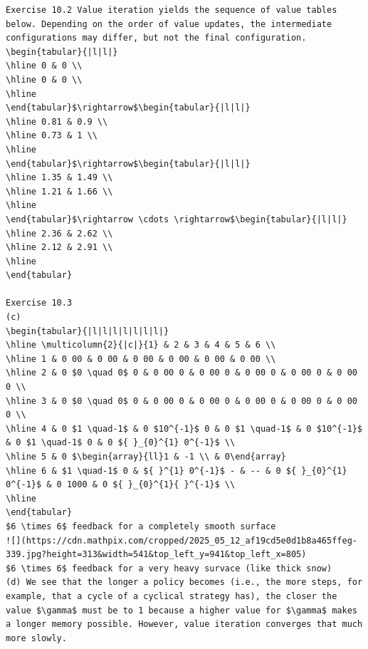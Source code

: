 \documentclass[10pt]{book}
\begin{document}
\begin{verbatim}
Exercise 10.2 Value iteration yields the sequence of value tables below. Depending on the order of value updates, the intermediate configurations may differ, but not the final configuration.
\begin{tabular}{|l|l|}
\hline 0 & 0 \\
\hline 0 & 0 \\
\hline
\end{tabular}$\rightarrow$\begin{tabular}{|l|l|}
\hline 0.81 & 0.9 \\
\hline 0.73 & 1 \\
\hline
\end{tabular}$\rightarrow$\begin{tabular}{|l|l|}
\hline 1.35 & 1.49 \\
\hline 1.21 & 1.66 \\
\hline
\end{tabular}$\rightarrow \cdots \rightarrow$\begin{tabular}{|l|l|}
\hline 2.36 & 2.62 \\
\hline 2.12 & 2.91 \\
\hline
\end{tabular}

Exercise 10.3
(c)
\begin{tabular}{|l|l|l|l|l|l|l|}
\hline \multicolumn{2}{|c|}{1} & 2 & 3 & 4 & 5 & 6 \\
\hline 1 & 0 00 & 0 00 & 0 00 & 0 00 & 0 00 & 0 00 \\
\hline 2 & 0 $0 \quad 0$ 0 & 0 00 0 & 0 00 0 & 0 00 0 & 0 00 0 & 0 00 0 \\
\hline 3 & 0 $0 \quad 0$ 0 & 0 00 0 & 0 00 0 & 0 00 0 & 0 00 0 & 0 00 0 \\
\hline 4 & 0 $1 \quad-1$ & 0 $10^{-1}$ 0 & 0 $1 \quad-1$ & 0 $10^{-1}$ & 0 $1 \quad-1$ 0 & 0 ${ }_{0}^{1} 0^{-1}$ \\
\hline 5 & 0 $\begin{array}{ll}1 & -1 \\ & 0\end{array}
\hline 6 & $1 \quad-1$ 0 & ${ }^{1} 0^{-1}$ - & -- & 0 ${ }_{0}^{1} 0^{-1}$ & 0 1000 & 0 ${ }_{0}^{1}{ }^{-1}$ \\
\hline
\end{tabular}
$6 \times 6$ feedback for a completely smooth surface
![](https://cdn.mathpix.com/cropped/2025_05_12_af19cd5e0d1b8a465ffeg-339.jpg?height=313&width=541&top_left_y=941&top_left_x=805)
$6 \times 6$ feedback for a very heavy survace (like thick snow)
(d) We see that the longer a policy becomes (i.e., the more steps, for example, that a cycle of a cyclical strategy has), the closer the value $\gamma$ must be to 1 because a higher value for $\gamma$ makes a longer memory possible. However, value iteration converges that much more slowly.


\end{verbatim}
\end{document}
